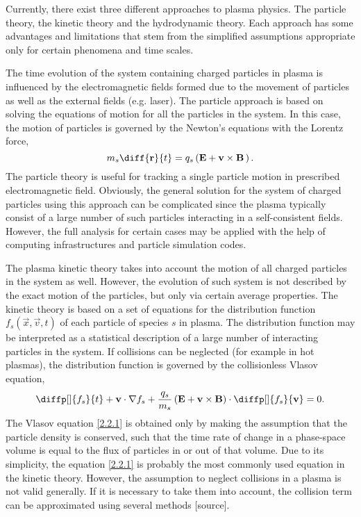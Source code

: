 Currently, there exist three different approaches to plasma physics. The particle theory, the kinetic theory and the hydrodynamic theory. Each approach has some advantages and limitations that stem from the simplified assumptions appropriate only for certain phenomena and time scales.

The time evolution of the system containing charged particles in plasma is influenced by the electromagnetic fields formed due to the movement of particles as well as the external fields (e.g. laser). The particle approach is based on solving the equations of motion for all the particles in the system. In this case, the motion of particles is governed by the Newton's equations with the Lorentz force,
\begin{equation}
\label{2.2.5}
m_s \diff{\vec{r}}{t} = q_s \left(\vec{E} + \vec{v} \times \vec{B} \, \right).
\end{equation}
The particle theory is useful for tracking a single particle motion in prescribed electromagnetic field. Obviously, the general solution for the system of charged particles using this approach can be complicated since the plasma typically consist of a large number of such particles interacting in a self-consistent fields. However, the full analysis for certain cases may be applied with the help of computing infrastructures and particle simulation codes.

The plasma kinetic theory takes into account the motion of all charged particles in the system as well. However, the evolution of such system is not described by the exact motion of the particles, but only via certain average properties. The kinetic theory is based on a set of equations for the distribution function $ f_s \left(\vec{x}, \vec{v}, t \right) $ of each particle of species $ s $ in plasma. The distribution function may be interpreted as a statistical description of a large number of interacting particles in the system. If collisions can be neglected (for example in hot plasmas), the distribution function is governed by the collisionless Vlasov equation,
\begin{equation}
\label{2.2.1}
\diffp[]{f_{s}}{t} + \vec{v} \cdot \nabla f_s + \frac{q_{s}}{m_{s}}\left( \vec{E} + \vec{v} \times \vec{B} \right) \cdot \diffp[]{f_s}{\vec{v}} = 0.
\end{equation}
The Vlasov equation \ref{2.2.1} is obtained only by making the assumption that the particle density is conserved, such that the time rate of change in a phase-space volume is equal to the flux of particles in or out of that volume. Due to its simplicity, the equation \ref{2.2.1} is probably the most commonly used equation in the kinetic theory. However, the assumption to neglect collisions in a plasma is not valid generally. If it is necessary to take them into account, the collision term can be approximated using several methods [source].
 
